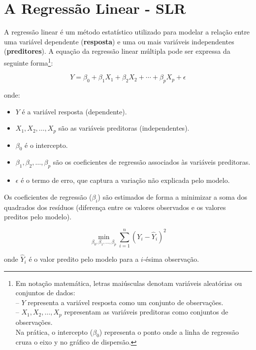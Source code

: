 \documentclass[article]{memoir}
\begin{document}
{\section{A Regressão Linear - SLR}

A regressão linear é um método estatístico utilizado para modelar a relação entre uma variável dependente (\textbf{resposta}) e uma ou mais variáveis independentes (\textbf{preditores}). A equação da regressão linear múltipla pode ser expressa da seguinte forma\footnote{Em notação matemática,  letras maiúsculas denotam variáveis aleatórias ou conjuntos de dados:\\
	-- $Y$ representa a variável resposta como um conjunto de observações.\\
	-- $X_1, X_2, \ldots, X_p$ representam as variáveis preditoras como conjuntos de observações.\\
	Na prática, o intercepto ($\beta_0$) representa o ponto onde a linha de regressão cruza o eixo y no gráfico de dispersão.}:

\begin{equation}
	Y = \beta_0 + \beta_1 X_1 + \beta_2 X_2 + \cdots + \beta_p X_p + \epsilon
\end{equation}

\noindent onde:
\begin{itemize}
	\item $Y$ é a variável resposta (dependente).
	\item $X_1, X_2, \ldots, X_p$ são as variáveis preditoras (independentes).
	\item $\beta_0$ é o intercepto.
	\item $\beta_1, \beta_2, \ldots, \beta_p$ são os coeficientes de regressão associados às variáveis preditoras.
	\item $\epsilon$ é o termo de erro, que captura a variação não explicada pelo modelo.
\end{itemize}

Os coeficientes de regressão ($\beta_i$) são estimados de forma a minimizar a soma dos quadrados dos resíduos (diferença entre os valores observados e os valores preditos pelo modelo).

\begin{equation}
	\min_{\beta_0, \beta_1, \ldots, \beta_p} \sum_{i=1}^{n} (Y_i - \hat{Y}_i)^2
\end{equation}

\noindent onde $\hat{Y}_i$ é o valor predito pelo modelo para a $i$-ésima observação.


}
\end{document}
